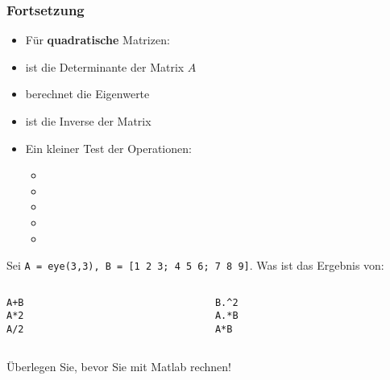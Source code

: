     \begin{frame}
        \frametitle{Fortsetzung}
        \begin{itemize}
            \item Für \textbf{quadratische} Matrizen:
            \item {} ist die Determinante der Matrix $A$
            \item {} berechnet die Eigenwerte
            \item {} ist die Inverse der Matrix
            \item Ein kleiner Test der Operationen:
            \begin{itemize}
                \item {}
                \item {}
                \item {}
                \item {}
                \item {}
            \end{itemize}
        \end{itemize}
    \end{frame}

    \secMexercise
    \begin{frame}
        \frameMexercise
        \begin{exercise}
            \sloppy
            Sei \texttt{A = eye(3,3), B = [1 2 3; 4 5 6; 7 8 9]}. Was ist das Ergebnis von: \\
            \begin{columns}[t]
              \begin{column}{5cm}
                \texttt{A+B} \keys{\return} \\
                \texttt{A*2} \keys{\return} \\
                \texttt{A/2} \keys{\return} \\
              \end{column}
              \begin{column}{5cm}
                  \texttt{B.\string^2} \keys{\return} \\
                  \texttt{A.*B} \keys{\return} \\
                  \texttt{A*B} \keys{\return}
              \end{column}
            \end{columns}

            \vspace{0.5cm}

            Überlegen Sie, bevor Sie mit Matlab rechnen!
        \end{exercise}
    \end{frame}


